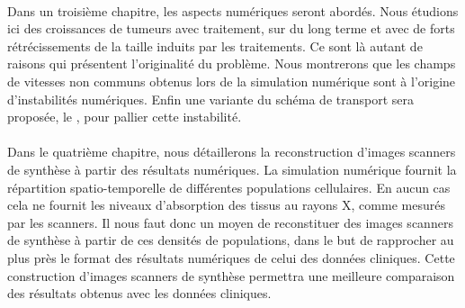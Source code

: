 \documentclass[main.tex]{subfiles}
\begin{document}
\paragraph{}
Dans un troisième chapitre, les aspects numériques seront abordés. 
Nous étudions ici des croissances de tumeurs avec traitement, sur du long terme et avec de forts rétrécissements de la taille induits par les traitements. Ce sont là autant de raisons qui présentent l'originalité du problème. Nous montrerons que les champs de vitesses non communs obtenus lors de la simulation numérique  sont à l'origine d'instabilités numériques. 
Enfin une variante du schéma de transport sera proposée, le \twinweno, pour pallier cette instabilité.

\paragraph{}
Dans le quatrième chapitre, nous détaillerons la reconstruction %
d'images scanners de synthèse à partir des résultats numériques. La simulation numérique fournit la répartition spatio-temporelle de différentes populations cellulaires. En aucun cas cela ne fournit les niveaux d'absorption des tissus au rayons X, comme mesurés par les scanners. Il nous faut donc un moyen de reconstituer des images scanners de synthèse à partir de ces densités de populations, dans le but de rapprocher au plus près %
le format des résultats numériques de celui des données cliniques.
Cette construction d'images scanners de synthèse permettra une meilleure comparaison des résultats obtenus avec les données cliniques. 
\end{document}
